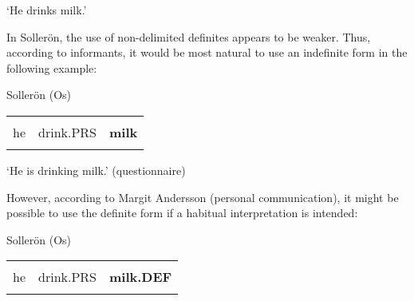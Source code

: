 \begin{styleTranslation}
‘He drinks milk.’

\end{styleTranslation}

\begin{styleBodyTextFirst}
In Sollerön, the use of non-delimited definites appears to be weaker. Thus, according to informants, it would be most natural to use an indefinite form in the following example:

\end{styleBodyTextFirst}

\begin{listWWNumileveli}
\item {}

\begin{styleExample}
Sollerön (Os) 

\end{styleExample}

\end{listWWNumileveli}

\begin{tabular}{lll}
\lsptoprule
\multicolumn{3}{l}{An

}\\
he & drink.PRS & {\bfseries milk}\\
\lspbottomrule
\end{tabular}

\begin{styleTranslation}
‘He is drinking milk.’ (questionnaire)

\end{styleTranslation}

\begin{styleBodyTextFirst}
However, according to Margit Andersson (personal communication), it might be possible to use the definite form if a habitual interpretation is intended:

\end{styleBodyTextFirst}

\begin{listWWNumileveli}
\item {}

\begin{styleExample}
\label{bkm:Ref173318047}Sollerön (Os) 

\end{styleExample}

\end{listWWNumileveli}

\begin{tabular}{lll}
\lsptoprule
\multicolumn{3}{l}{An

}\\
he & drink.PRS & {\bfseries milk.DEF}\\
\lspbottomrule
\end{tabular}

